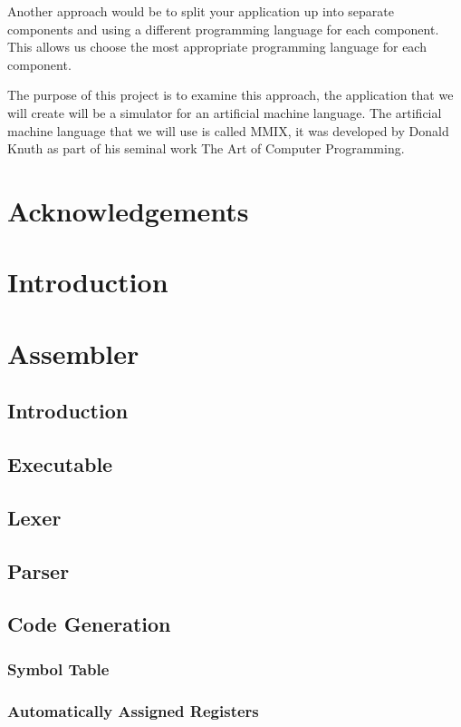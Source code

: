 \documentclass[a4paper,11pt]{report}
\begin{document}
Another approach would be to split your application up into separate components and using a different programming language for each component. This allows us choose the most appropriate programming language for each component.

The purpose of this project is to examine this approach, the application that we will create will be a simulator for an artificial machine language. The artificial machine language that we will use is called MMIX, it was developed by Donald Knuth as part of his seminal work The Art of Computer Programming\cite{knuth:aocp1}.
\newpage
{}
\tableofcontents
\newpage
\listoffigures
\newpage
\chapter*{Acknowledgements}
\chapter{Introduction}
\chapter{Assembler}
\section{Introduction}
\section{Executable}
\section{Lexer}
\section{Parser}
\section{Code Generation}
\subsection{Symbol Table}
\subsection{Automatically Assigned Registers}
\end{document}
